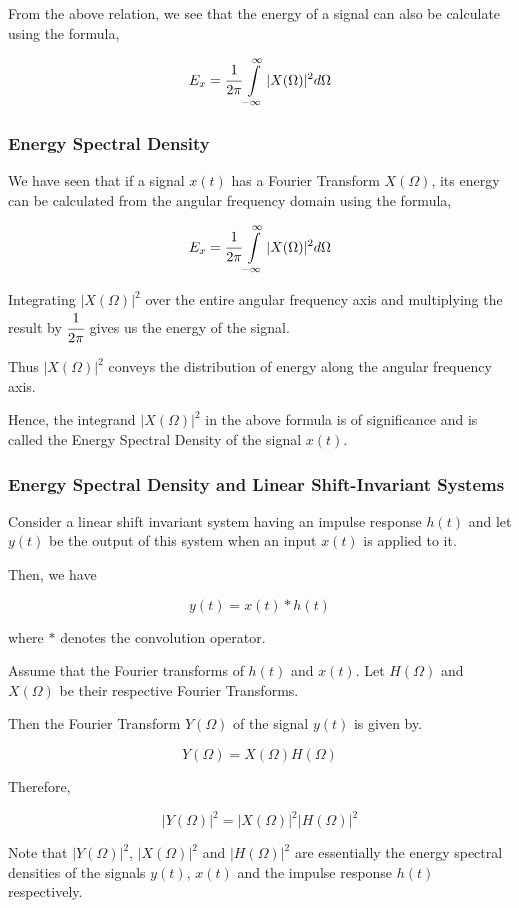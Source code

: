 \noindent
From the above relation, we see that the energy of a signal can also be calculate using the formula,

$$E_x = \cfrac{1}{2\pi}\int\limits_{-\infty}^{\infty}|X(\Omega)|^2d\Omega$$

\subsubsection{Energy Spectral Density}
\noindent
We have seen that if a signal $x(t)$ has a Fourier Transform $X(\Omega)$, its energy can be calculated from the angular frequency domain using the formula,

$$E_x = \cfrac{1}{2\pi}\int\limits_{-\infty}^{\infty}|X(\Omega)|^2d\Omega$$

\noindent
Integrating $|X(\Omega)|^2$ over the entire angular frequency axis and multiplying the result by $\cfrac{1}{2\pi}$ gives us the energy of the signal.

\noindent
Thus $|X(\Omega)|^2$ conveys the distribution of energy along the angular frequency axis.

\noindent
Hence, the integrand $|X(\Omega)|^2$ in the above formula is of significance and is called the Energy Spectral Density of the signal $x(t)$.

\subsubsection{Energy Spectral Density and Linear Shift-Invariant Systems}
\noindent
Consider a linear shift invariant system having an impulse response $h(t)$ and let $y(t)$ be the output  of this system when an input $x(t)$ is applied to it.

\noindent
Then, we have

$$y(t) = x(t)*h(t)$$

\noindent
where $*$ denotes the convolution operator.

\noindent
Assume that the Fourier transforms of $h(t)$ and $x(t)$. Let $H(\Omega)$ and $X(\Omega)$ be their respective Fourier Transforms.

\noindent
Then the Fourier Transform $Y(\Omega)$ of the signal $y(t)$ is given by.

$$Y(\Omega) = X(\Omega)H(\Omega)$$

\noindent
Therefore,

$$|Y(\Omega)|^2 = |X(\Omega)|^2|H(\Omega)|^2$$

\noindent
Note that $|Y(\Omega)|^2$, $|X(\Omega)|^2$ and $|H(\Omega)|^2$ are essentially the energy spectral densities of the signals $y(t)$, $x(t)$ and the impulse response $h(t)$ respectively.

